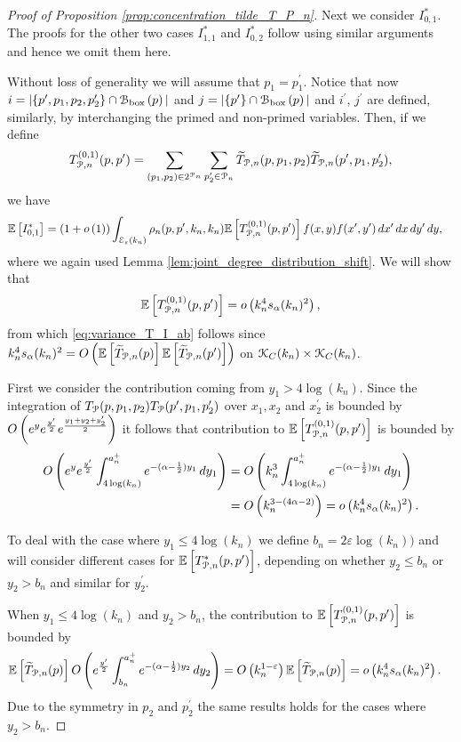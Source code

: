 \begin{proof}[Proof of Proposition \ref{prop:concentration_tilde_T_P_n}]
Next we consider $I_{0,1}^\ast$. The proofs for the other two cases $I_{1,1}^\ast$ and $I_{0,2}^\ast$ follow using similar arguments and hence we omit them here.

Without loss of generality we will assume that $p_1 = p_1^\prime$. Notice that now $i = |\{p^\prime, p_1, p_2, p_2^\prime\} \cap {\mathcal B}_{\text{box}}\left(p\right)|$ and $j = |\{p^\prime\} \cap {\mathcal B}_{\text{box}}\left(p\right)|$ and $i^\prime$, $j^\prime$ are defined, similarly, by interchanging the primed and non-primed variables. Then, if we define
\[
	T^{(0,1)}_{{\mathcal P},n}(p,p^\prime) = \sum_{(p_1,p_2) \in 2^{{\mathcal P}_n}} \sum_{p_2^\prime \in {\mathcal P}_n} \widetilde{T}_{{\mathcal P},n}(p,p_1,p_2) \widetilde{T}_{{\mathcal P},n}(p^\prime,p_1,p_2^\prime),
\]
we have
\begin{align*}
	\mathbb{E}\left[I_{0,1}^\ast\right] &= (1+o\left(1\right))\int_{\mathcal{E}_{\varepsilon}(k_n)} \rho_n(p,p^\prime,k_n,k_n)
			\mathbb{E}\left[T^{(0,1)}_{{\mathcal P},n}(p,p^\prime)\right] f(x,y)
			f(x^\prime,y^\prime) \, dx^\prime \, dx \, dy^\prime \, dy,
\end{align*} 
where we again used Lemma  \ref{lem:joint_degree_distribution_shift}.
We will show that 
\[
	\mathbb{E}\left[T^{(0,1)}_{{\mathcal P},n}(p,p^\prime)\right] = o\left(k_n^4 s_\alpha(k_n)^2\right),
\] 
from which \eqref{eq:variance_T_I_ab} follows since $k_n^4 s_\alpha(k_n)^2 = O\left(\mathbb{E}\left[\widetilde{T}_{{\mathcal P},n}(p)\right] \mathbb{E}\left[\widetilde{T}_{{\mathcal P},n}(p^\prime)\right]\right)$ on ${\mathcal K}_{C}(k_n) \times {\mathcal K}_{C}(k_n)$.

First we consider the contribution coming from $y_1 > 4 \log(k_n)$. Since the integration of $T_{{\mathcal P}}(p,p_1,p_2) T_{{\mathcal P}}(p^\prime,p_1,p_2^\prime)$ over $x_1, x_2$ and $x_2^\prime$ is bounded by $O\left(e^{y}e^{\frac{y^\prime}{2}} e^{\frac{y_1 + y_2 + y_2^\prime}{2}}\right)$ it follows that contribution to $\mathbb{E}\left[T^{(0,1)}_{{\mathcal P},n}(p,p^\prime)\right]$ is bounded by
\begin{align*}
	O\left(e^{y}e^{\frac{y^\prime}{2}} \int_{4\log(k_n)}^{a_n^+} e^{-(\alpha - \frac{1}{2})y_1} \, dy_1\right)
	&= O\left(k_n^3 \int_{4\log(k_n)}^{a_n^+} e^{-(\alpha - \frac{1}{2})y_1} \, dy_1\right)\\
	&= O\left(k_n^{3 - (4\alpha - 2)}\right) = o\left(k_n^4 s_\alpha(k_n)^2\right).
\end{align*}

To deal with the case where $y_1 \le 4\log(k_n)$ we define $b_n = 2\varepsilon\log(k_n))$ and will consider different cases for $\mathbb{E}\left[T^\ast_{{\mathcal P},n}(p,p^\prime)\right]$, depending on whether $y_2 \le b_n$ or $y_2 > b_n$ and similar for $y_2^\prime$. 

When $y_1 \le 4\log(k_n)$ and $y_2 > b_n$, the contribution to $\mathbb{E}\left[T^{(0,1)}_{{\mathcal P},n}(p,p^\prime)\right]$ is bounded by
\begin{align*}
	\mathbb{E}\left[\widetilde{T}_{{\mathcal P},n}(p)\right]
		O\left(e^{\frac{y^\prime}{2}}\int_{b_n}^{a_n^+} e^{-(\alpha -\frac{1}{2})y_2} \, dy_2\right)
	&= O\left(k_n^{1 - \varepsilon}\right)\mathbb{E}\left[\widetilde{T}_{{\mathcal P},n}(p)\right]
	= o\left(k_n^4 s_\alpha(k_n)^2\right).
\end{align*}
Due to the symmetry in $p_2$ and $p_2^\prime$ the same results holds for the cases where $y_2 > b_n$.


\end{proof}
